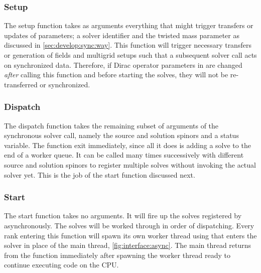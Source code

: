 \subsubsection{Setup}

The setup function  takes as arguments everything that might trigger transfers or updates of parameters; a solver identifier and the twisted mass parameter as discussed in \cref{sec:develop:sync:way}.
This function will trigger necessary transfers or generation of fields and multigrid setups such that a subsequent solver call acts on synchronized data.
Therefore, if Dirac operator parameters in \openqxd are changed \emph{after} calling this function and before starting the solves, they will not be re-transferred or synchronized.

\subsubsection{Dispatch}

The dispatch function  takes the remaining subset of arguments of the synchronous solver call, namely the source and solution spinors and a status variable.
The function exit immediately, since all it does is adding a solve to the end of a worker queue.
It can be called many times successively with different source and solution spinors to register multiple solves without invoking the actual solver yet.
This is the job of the start function discussed next.

\subsubsection{Start}
\label{sec:interface:solver:async:start}

The start function  takes no arguments.
It will fire up the solves registered by  asynchronously.
The solves will be worked through in order of dispatching.
Every rank entering this function will spawn its own worker thread using  that enters the \quda solver in place of the main thread, \cref{fig:interface:async}.
The main thread returns from the function immediately after spawning the worker thread ready to continue executing code on the CPU.

